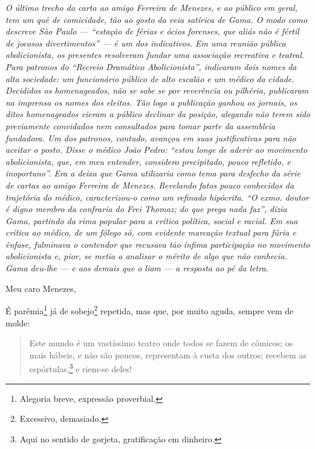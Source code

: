 
\begin{resumo}
\emph{O último trecho da carta ao amigo Ferreira de Menezes, e ao
público em geral, tem um quê de comicidade, tão ao gosto da veia
satírica de Gama. O modo como descreve São Paulo --- ``estação de férias e
ócios forenses, que aliás não é fértil de jocosos divertimentos'' --- é um
dos indicativos. Em uma reunião pública abolicionista, os presentes
resolveram fundar uma associação recreativa e teatral. Para patronos do
``Recreio Dramático Abolicionista'', indicaram dois nomes da alta
sociedade: um funcionário público de alto escalão e um médico da cidade.
Decididos os homenageados, não se sabe se por reverência ou pilhéria,
publicaram na imprensa os nomes dos eleitos. Tão logo a publicação
ganhou os jornais, os ditos homenageados vieram a público declinar da
posição, alegando não terem sido previamente convidados nem
consultados para tomar parte da assembleia fundadora. Um dos patronos,
contudo, avançou em suas justificativas para não aceitar o posto. Disse
o médico João Pedro: ``estou longe de aderir ao movimento abolicionista,
que, em meu entender, considero precipitado, pouco refletido, e
inoportuno''. Era a deixa que Gama utilizaria como tema para desfecho da
série de cartas ao amigo Ferreira de Menezes. Revelando fatos pouco
conhecidos da trajetória do médico, caracterizou-o como um refinado hipócrita. ``O exmo.
doutor é digno membro da confraria do Frei Thomaz; do que prega nada
faz'', dizia Gama, partindo da rima popular para a crítica política,
social e racial. Em sua crítica ao médico, de um fôlego só, com evidente
marcação textual para fúria e ênfase, fulminava o contendor que recusava tão ínfima
participação no movimento abolicionista e, pior, se metia a analisar o
mérito de algo que não conhecia. Gama deu-lhe --- e aos demais que o liam
--- a resposta ao pé da letra.}
\end{resumo}\pagebreak

Meu caro Menezes,

É parêmia\footnote{Alegoria breve, expressão proverbial.} já de
sobejo\footnote{Excessivo, demasiado.} repetida, mas que, por muito
aguda, sempre vem de molde:

\begin{quote}
Este mundo é um vastíssimo teatro onde todos se fazem de cômicos; os
mais hábeis, e não são poucos, representam à custa dos outros; recebem
as espórtulas,\footnote{Aqui no sentido de gorjeta, gratificação em
  dinheiro.} e riem-se deles!
\end{quote}

